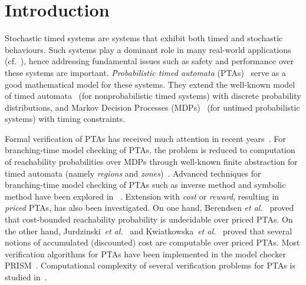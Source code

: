 
\vspace{-0.8em}
\section{Introduction}
\vspace{-0.8em}

Stochastic timed systems are systems that exhibit both timed and stochastic behaviours.
Such systems play a dominant role in many real-world applications (cf.~\cite{DBLP:books/daglib/0020348}), hence
addressing fundamental issues such as safety and performance over these systems are important.
\emph{Probabilistic timed automata} (PTAs)~\cite{DBLP:journals/fmsd/NormanPS13,DBLP:journals/tcs/Beauquier03,DBLP:journals/tcs/KwiatkowskaNSS02} serve as a good mathematical model for these systems.
They extend the well-known model of timed automata~\cite{DBLP:journals/tcs/AlurD94} (for nonprobabilistic timed systems) with discrete probability distributions, and Markov Decision Processes (MDPs)~\cite{PutermanMDP} (for untimed probabilistic systems) with timing constraints.

Formal verification of PTAs has received much attention in recent years~\cite{DBLP:journals/fmsd/NormanPS13}.
For branching-time model checking of PTAs, the problem is reduced to computation of reachability probabilities over MDPs through well-known finite abstraction for timed automata (namely \emph{regions} and \emph{zones})~\cite{JensenPTA,DBLP:journals/tcs/Beauquier03,DBLP:journals/tcs/KwiatkowskaNSS02}.
Advanced techniques for branching-time model checking of PTAs such as inverse method and symbolic method have been explored in  ~\cite{DBLP:journals/fmsd/AndreFS13,DBLP:journals/iandc/KwiatkowskaNSW07,DBLP:conf/formats/KwiatkowskaNP09,DBLP:conf/formats/JovanovicKN15}.
Extension with \emph{cost} or \emph{reward}, resulting in \emph{priced} PTAs, has also been investigated.
On one hand, Berendsen \emph{et al.}~\cite{DBLP:conf/tamc/BerendsenCJ09} proved that cost-bounded reachability probability is undecidable over priced PTAs.
On the other hand, Jurdzinski~\emph{et al.}~\cite{DBLP:conf/concur/JurdzinskiKNT09} and Kwiatkowska~\emph{et al.}~\cite{DBLP:journals/fmsd/KwiatkowskaNPS06} proved that several notions of accumulated (discounted) cost are computable over priced PTAs.
Most verification algorithms for PTAs have been implemented in the model checker PRISM~\cite{DBLP:conf/cav/KwiatkowskaNP11}. Computational complexity of several verification problems for PTAs is studied in~\cite{DBLP:journals/ipl/LaroussinieS07,DBLP:journals/lmcs/JurdzinskiSL08,DBLP:conf/concur/JurdzinskiKNT09}.

